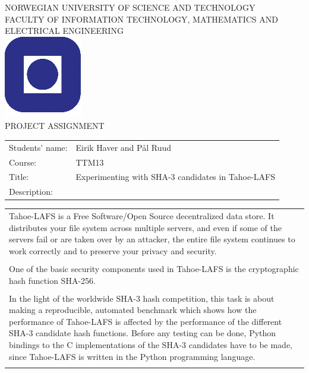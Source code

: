 %
\begin{titlepage}
\begin{center}
\textsc{NORWEGIAN UNIVERSITY OF SCIENCE AND TECHNOLOGY\\
FACULTY OF  INFORMATION TECHNOLOGY, MATHEMATICS AND ELECTRICAL ENGINEERING} \\
\vspace{0.5cm} 
\includegraphics[scale=0.5]{NTNU-logo.png} \\

\vspace{1.0cm}
{\Huge{PROJECT ASSIGNMENT}}
\vspace{1.0cm}

\begin{tabular}{ p{4cm} p{11cm}}

Students' name:	& Eirik Haver and Pål Ruud \\
Course: & TTM13 \\
Title: & Experimenting with SHA-3 candidates in Tahoe-LAFS \\
Description: & \\
\end{tabular}
{\small{\begin{tabular}{p{15cm}}
\vspace{0.2cm}

Tahoe-LAFS is a Free Software/Open Source decentralized data store. It
distributes your file system across multiple servers, and even if some of the
servers fail or are taken over by an attacker, the entire file system continues
to work correctly and to preserve your privacy and security.
\\\\
One of the basic security components used in Tahoe-LAFS is the cryptographic
hash function SHA-256.
\\\\
In the light of the worldwide SHA-3 hash competition, this task is about
making a reproducible, automated benchmark which shows how the performance of
Tahoe-LAFS is affected by the performance of the different SHA-3 candidate hash
functions. Before any testing can be done, Python bindings to the C
implementations of the SHA-3 candidates have to be made, since Tahoe-LAFS is
written in the Python programming language.
\\\\
\end{tabular}  }}


\end{center}
\end{titlepage}
